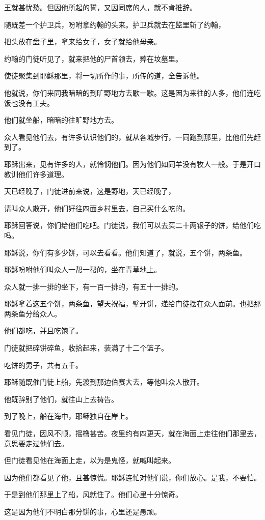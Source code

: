 \documentclass[12pt,oneside]{book}
\begin{document}
王就甚忧愁。但因他所起的誓，又因同席的人，就不肯推辞。

随既差一个护卫兵，吩咐拿约翰的头来。护卫兵就去在监里斩了约翰，

把头放在盘子里，拿来给女子，女子就给他母亲。

约翰的门徒听见了，就来把他的尸首领去，葬在坟墓里。

使徒聚集到耶稣那里，将一切所作的事，所传的道，全告诉他。

他就说，你们来同我暗暗的到旷野地方去歇一歇。这是因为来往的人多，他们连吃饭也没有工夫。

他们就坐船，暗暗的往旷野地方去。

众人看见他们去，有许多认识他们的，就从各城步行，一同跑到那里，比他们先赶到了。

耶稣出来，见有许多的人，就怜悯他们。因为他们如同羊没有牧人一般。于是开口教训他们许多道理。

天已经晚了，门徒进前来说，这是野地，天已经晚了，

请叫众人散开，他们好往四面乡村里去，自己买什么吃的。

耶稣回答说，你们给他们吃吧。门徒说，我们可以去买二十两银子的饼，给他们吃吗。

耶稣说，你们有多少饼，可以去看看。他们知道了，就说，五个饼，两条鱼。

耶稣吩咐他们叫众人一帮一帮的，坐在青草地上。

众人就一排一排的坐下，有一百一排的，有五十一排的。

耶稣拿着这五个饼，两条鱼，望天祝福，擘开饼，递给门徒摆在众人面前。也把那两条鱼分给众人。

他们都吃，并且吃饱了。

门徒就把碎饼碎鱼，收拾起来，装满了十二个篮子。

吃饼的男子，共有五千。

耶稣随既催门徒上船，先渡到那边伯赛大去，等他叫众人散开。

他既辞别了他们，就往山上去祷告。

到了晚上，船在海中，耶稣独自在岸上。

看见门徒，因风不顺，摇橹甚苦。夜里约有四更天，就在海面上走往他们那里去，意思要走过他们去。

但门徒看见他在海面上走，以为是鬼怪，就喊叫起来。

因为他们都看见了他，且甚惊慌。耶稣连忙对他们说，你们放心。是我，不要怕。

于是到他们那里上了船，风就住了。他们心里十分惊奇。

这是因为他们不明白那分饼的事，心里还是愚顽。
\end{document}
